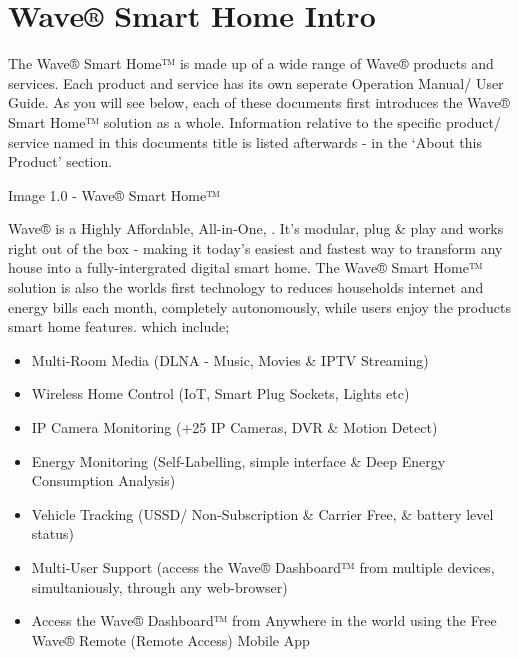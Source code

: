 \documentclass[letterpaper,10pt,openany,oneside,english]{sphinxmanual}
\begin{document}
\chapter{Wave® Smart Home Intro}
\label{\detokenize{introduction:wave-smart-home-intro}}\label{\detokenize{introduction::doc}}
The Wave® Smart Home™ is made up of a wide range of Wave® products and services. Each product and service has its own seperate Operation Manual/ User Guide.
As you will see below, each of these documents first introduces the Wave® Smart Home™ solution as a whole.
Information relative to the specific product/ service named in this documents title is listed afterwards - in the ‘About this Product’ section.

Image 1.0 - Wave® Smart Home™

\noindent{}

Wave® is a Highly Affordable, All-in-One, . It’s modular, plug \& play and works right out of the box - making it today’s easiest and fastest way to transform any house into a fully-intergrated digital smart home. The Wave® Smart Home™ solution is also the worlds first technology to reduces households internet and energy bills each month, completely autonomously, while users enjoy the products  smart home features. which include;
\begin{itemize}
\item {} 
Multi-Room Media (DLNA - Music, Movies \& IPTV Streaming)

\item {} 
Wireless Home Control (IoT, Smart Plug Sockets, Lights etc)

\item {} 
IP Camera Monitoring (+25 IP Cameras, DVR \& Motion Detect)

\item {} 
Energy Monitoring (Self-Labelling, simple interface \& Deep Energy Consumption Analysis)

\item {} 
Vehicle Tracking (USSD/ Non-Subscription \& Carrier Free, \& battery level status)

\item {} 
Multi-User Support (access the Wave® Dashboard™ from multiple devices, simultaniously, through any web-browser)

\item {} 
Access the Wave® Dashboard™ from Anywhere in the world using the Free Wave® Remote (Remote Access) Mobile App

\end{itemize}
\end{document}
